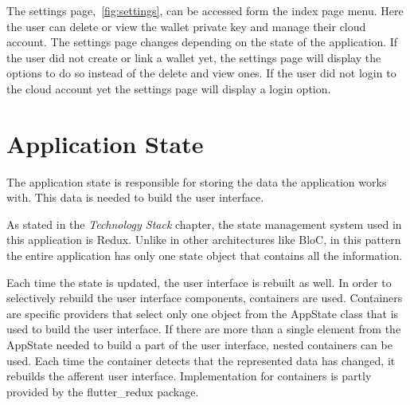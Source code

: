 \documentclass[a4paper,12pt]{report}
\begin{document}
The settings page,~\autoref{fig:settings}, can be accessed form the index page
menu. Here the user can delete or view the wallet private key and manage their
cloud account. The settings page changes depending on the state of the
application. If the user did not create or link a wallet yet, the settings page
will display the options to do so instead of the delete and view ones. If the
user did not login to the cloud account yet the settings page will display a
login option.

\section{Application State}

The application state is responsible for storing the data the application works
with. This data is needed to build the user interface.

As stated in the \textit{Technology Stack} chapter, the state management system
used in this application is Redux. Unlike in other architectures like BloC, in
this pattern the entire application has only one state object that contains all
the information.

Each time the state is updated, the user interface is rebuilt as well. In order
to selectively rebuild the user interface components, containers are used.
Containers are specific providers that select only one object from the AppState
class that is used to build the user interface. If there are more than a single
element from the AppState needed to build a part of the user interface, nested
containers can be used. Each time the container detects that the represented
data has changed, it rebuilds the afferent user interface. Implementation for
containers is partly provided by the flutter\_redux
package\cite{flutterReduxDocs}.
\end{document}
